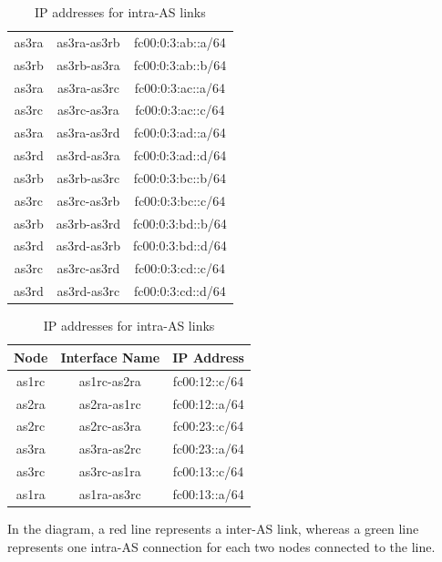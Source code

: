 \begin{table}[h!]
\begin{tabular}{|c|c|c|}
as3ra & as3ra-as3rb & fc00:0:3:ab::a/64 \\
as3rb & as3rb-as3ra & fc00:0:3:ab::b/64 \\

as3ra & as3ra-as3rc & fc00:0:3:ac::a/64 \\
as3rc & as3rc-as3ra & fc00:0:3:ac::c/64 \\

as3ra & as3ra-as3rd & fc00:0:3:ad::a/64 \\
as3rd & as3rd-as3ra & fc00:0:3:ad::d/64 \\

as3rb & as3rb-as3rc & fc00:0:3:bc::b/64 \\
as3rc & as3rc-as3rb & fc00:0:3:bc::c/64 \\

as3rb & as3rb-as3rd & fc00:0:3:bd::b/64 \\
as3rd & as3rd-as3rb & fc00:0:3:bd::d/64 \\

as3rc & as3rc-as3rd & fc00:0:3:cd::c/64 \\
as3rd & as3rd-as3rc & fc00:0:3:cd::d/64 \\
\hline
\end{tabular}
\caption{IP addresses for intra-AS links}
\label{table:gbp_interfaces_intra}
\end{table}
\begin{table}[h!]
\centering
\begin{tabular}{|c|c|c|}
\hline
\textbf{Node} & \textbf{Interface Name} & \textbf{IP Address} \\
\hline
as1rc & as1rc-as2ra & fc00:12::c/64 \\
as2ra & as2ra-as1rc & fc00:12::a/64 \\

as2rc & as2rc-as3ra & fc00:23::c/64 \\
as3ra & as3ra-as2rc & fc00:23::a/64 \\

as3rc & as3rc-as1ra & fc00:13::c/64 \\
as1ra & as1ra-as3rc & fc00:13::a/64 \\
\hline
\end{tabular}
\caption{IP addresses for intra-AS links}
\label{table:gbp_interfaces_inter}
\end{table}

In the diagram, a red line represents a inter-AS link, whereas a green line represents one intra-AS connection for each two nodes connected to the line.\\